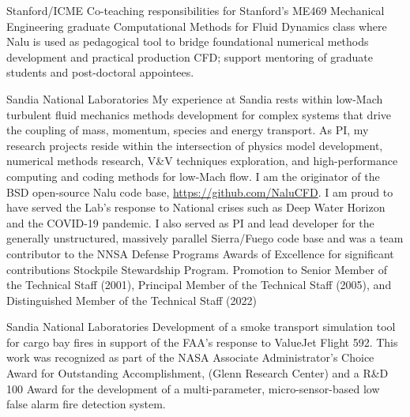 \documentclass[letterpaper]{twentysecondcv_spd} %
\begin{document}
\begin{twenty} %

    {Stanford/ICME} {Co-teaching responsibilities for Stanford's ME469 Mechanical Engineering graduate Computational 
   Methods for Fluid Dynamics class where Nalu is used as pedagogical tool to bridge foundational numerical methods development and practical production CFD;
   support mentoring of graduate students and post-doctoral appointees.}

    {Sandia National Laboratories} {My experience at Sandia rests within low-Mach 
    turbulent fluid mechanics methods development for complex systems that drive the coupling of mass, momentum, species and energy transport. 
    As PI, my research projects reside within the intersection of physics model development, numerical methods research, V\&V techniques exploration, and 
    high-performance computing and coding methods for low-Mach flow. I am the originator of the BSD open-source Nalu
    code base, \underline{https://github.com/NaluCFD}. I am proud to have served the Lab's response to National crises 
    such as Deep Water Horizon and the COVID-19 pandemic. I also served as PI and lead developer for the generally unstructured, massively 
    parallel Sierra/Fuego code base and was a team contributor to the NNSA Defense Programs Awards of Excellence for 
    significant contributions Stockpile Stewardship Program. Promotion to Senior Member of the Technical Staff (2001), Principal Member of the Technical Staff (2005), and 
    Distinguished Member of the Technical Staff (2022)}
    
   {Sandia National Laboratories}  {Development of a smoke transport simulation tool for cargo bay 
  fires in support of the FAA's response to ValueJet Flight 592. This work was recognized as part of the NASA Associate Administrator's Choice Award for Outstanding Accomplishment, (Glenn Research Center) 
  and a R\&D 100 Award for the development of a multi-parameter, micro-sensor-based low false alarm fire detection system.}
  
\end{twenty}



\end{document}
